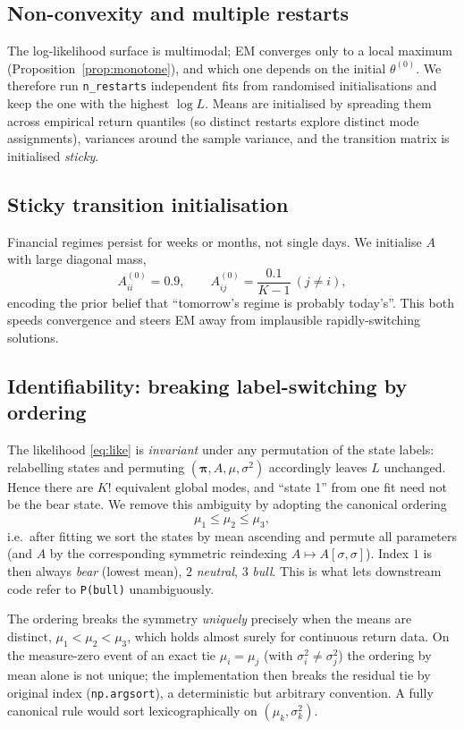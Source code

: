 \documentclass[11pt]{article}
\newcommand{\nstate}{K}
\theoremstyle{plain}
\theoremstyle{definition}
\theoremstyle{remark}
\begin{document}
\subsection{Non-convexity and multiple restarts}
The log-likelihood surface is multimodal; EM converges only to a local maximum
(Proposition~\ref{prop:monotone}), and which one depends on the initial
$\theta^{(0)}$. We therefore run \texttt{n\_restarts} independent fits from
randomised initialisations and keep the one with the highest $\log L$. Means are
initialised by spreading them across empirical return quantiles (so distinct
restarts explore distinct mode assignments), variances around the sample
variance, and the transition matrix is initialised \emph{sticky}.

\subsection{Sticky transition initialisation}
Financial regimes persist for weeks or months, not single days. We initialise
$A$ with large diagonal mass,
\begin{equation}
  A^{(0)}_{ii}=0.9,\qquad A^{(0)}_{ij}=\frac{0.1}{\nstate-1}\ (j\ne i),
\end{equation}
encoding the prior belief that ``tomorrow's regime is probably today's''. This
both speeds convergence and steers EM away from implausible rapidly-switching
solutions.

\subsection{Identifiability: breaking label-switching by ordering}\label{sec:label}
The likelihood \eqref{eq:like} is \emph{invariant} under any permutation of the
state labels: relabelling states and permuting $(\bm\pi,A,\mu,\sigma^2)$
accordingly leaves $L$ unchanged. Hence there are $\nstate!$ equivalent global
modes, and ``state 1'' from one fit need not be the bear state. We remove this
ambiguity by adopting the canonical ordering
\begin{equation}
  \mu_1 \le \mu_2 \le \mu_3,
\end{equation}
i.e.\ after fitting we sort the states by mean ascending and permute all
parameters (and $A$ by the corresponding symmetric reindexing
$A\mapsto A[\sigma,\sigma]$). Index $1$ is then always \emph{bear} (lowest mean),
$2$ \emph{neutral}, $3$ \emph{bull}. This is what lets downstream code refer to
\texttt{P(bull)} unambiguously.

The ordering breaks the symmetry \emph{uniquely} precisely when the means are
distinct, $\mu_1<\mu_2<\mu_3$, which holds almost surely for continuous return
data. On the measure-zero event of an exact tie $\mu_i=\mu_j$ (with
$\sigma_i^2\ne\sigma_j^2$) the ordering by mean alone is not unique; the
implementation then breaks the residual tie by original index
(\texttt{np.argsort}), a deterministic but arbitrary convention. A fully
canonical rule would sort lexicographically on $(\mu_k,\sigma_k^2)$.
\end{document}
